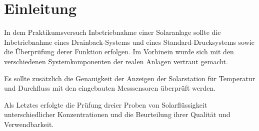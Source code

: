 \section{Einleitung}

In dem Praktikumsversuch Inbetriebnahme einer Solaranlage sollte die Inbetriebnahme eines Drainback-Systems und eines Standard-Drucksystems sowie die Überprüfung derer Funktion erfolgen. Im Vorhinein wurde sich mit den verschiedenen Systemkomponenten der realen Anlagen vertraut gemacht.  

Es sollte zusätzlich die Genauigkeit der Anzeigen der Solarstation für Temperatur und Durchfluss mit den eingebauten Messsensoren überprüft werden. 

Als Letztes erfolgte die Prüfung dreier Proben von Solarflüssigkeit unterschiedlicher Konzentrationen und die Beurteilung ihrer Qualität und Verwendbarkeit. 



